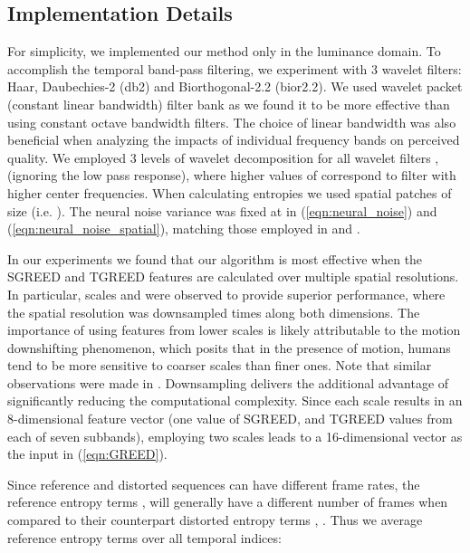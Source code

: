 \documentclass[journal]{IEEEtran}
\newcommand{\ie}{{i}.{e}.}
\begin{document}
\subsection{Implementation Details}
For simplicity, we implemented our method only in the luminance domain. To accomplish the temporal band-pass filtering, we experiment with 3 wavelet filters: Haar, Daubechies-2 (db2) and Biorthogonal-2.2 (bior2.2). We used wavelet packet (constant linear bandwidth) filter bank \cite{coifman1992entropy} as we found it to be more effective than using constant octave bandwidth filters. The choice of linear bandwidth was also beneficial when analyzing the impacts of individual frequency bands on perceived quality. We employed 3 levels of wavelet decomposition for all wavelet filters ,  (ignoring the low pass response), where higher values of  correspond to filter with higher center frequencies. When calculating entropies we used spatial patches of size  (\ie{ }). The neural noise variance was fixed at  in (\ref{eqn:neural_noise}) and (\ref{eqn:neural_noise_spatial}), matching those employed in \cite{soundararajan2012video} and \cite{bampis2017speed}. 

In our experiments we found that our algorithm is most effective when the SGREED and TGREED features are calculated over multiple spatial resolutions. In particular, scales  and  were observed to provide superior performance, where the spatial resolution was downsampled  times along both dimensions. The importance of using features from lower scales is likely attributable to the motion downshifting phenomenon, which posits that in the presence of motion, humans tend to be more sensitive to coarser scales than finer ones. Note that similar observations were made in \cite{soundararajan2012video,bampis2017speed,bampis2018spatiotemporal}. Downsampling delivers the additional advantage of significantly reducing the computational complexity. Since each scale results in an 8-dimensional feature vector (one value of SGREED, and TGREED values from each of seven subbands), employing two scales leads to a 16-dimensional vector as the input in (\ref{eqn:GREED}). 

Since reference and distorted sequences can have different frame rates, the reference entropy terms ,  will generally have a different number of frames when compared to their counterpart distorted entropy terms , . Thus we average reference entropy terms over all temporal indices:
\end{document}
